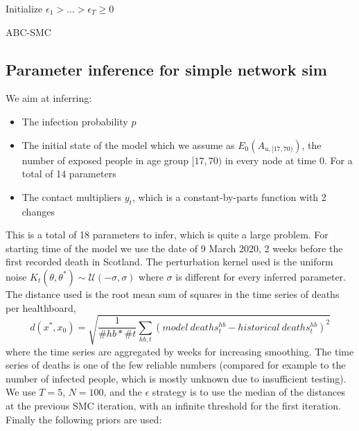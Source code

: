 \documentclass[11pt]{article}
\begin{document}
\begin{algorithm}[H]
\SetAlgoLined
 Initialize $\epsilon_1 > ... > \epsilon_T \geq 0$\;
 \caption{ABC-SMC}
\end{algorithm}

\subsection{Parameter inference for simple network sim}

We aim at inferring:
\begin{itemize}
\item The infection probability $p$
\item The initial state of the model which we assume as $E_0(A_{u,[17, 70)})$, the number of exposed people in age group $[17,70)$ in every node at time 0. For a total of 14 parameters
\item The contact multipliers $y_t$, which is a constant-by-parts function with 2 changes
\end{itemize}

This is a total of 18 parameters to infer, which is quite a large problem. For starting time of the model we use the date of 9 March 2020, 2 weeks before the first recorded death in Scotland. The perturbation kernel used is the uniform noise $K_t(\theta, \theta^*) \sim \mathcal{U}(-\sigma, \sigma)$ where $\sigma$ is different for every inferred parameter. The distance used is the root mean sum of squares in the time series of deaths per healthboard, $$d(x^*, x_0)=\sqrt{\frac{1}{\#hb * \#t}\sum_{hb, t} (model \ deaths^{hb}_t - historical \ deaths^{hb}_t)^2}$$ where the time series are aggregated by weeks for increasing smoothing. The time series of deaths is one of the few reliable numbers (compared for example to the number of infected people, which is mostly unknown due to insufficient testing). We use $T=5$, $N=100$, and the $\epsilon$ strategy is to use the median of the distances at the previous SMC iteration, with an infinite threshold for the first iteration. Finally the following priors are used:
\end{document}
